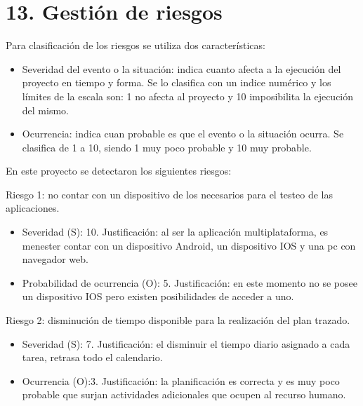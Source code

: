 \documentclass[
11pt, %
]{charter}
\begin{document}
\section{13. Gestión de riesgos}
\label{sec:riesgos}

Para clasificación de los riesgos se utiliza dos características: 
\begin{itemize}
\item Severidad del evento o la situación: indica cuanto afecta a la ejecución del proyecto en tiempo y forma. Se lo clasifica con un indice numérico y los límites de la escala son:  1 no afecta al proyecto y 10  imposibilita la ejecución del mismo.
\item Ocurrencia: indica cuan probable es que el evento o la situación ocurra. Se clasifica de 1 a 10, siendo 1 muy poco probable y 10 muy probable. 
\end{itemize}

En este proyecto se detectaron los siguientes riesgos:

 
Riesgo 1: no contar con un dispositivo de los necesarios para el testeo de las aplicaciones.
\begin{itemize}
	\item Severidad (S): 10.\newline 
	Justificación: al ser la aplicación multiplataforma, es menester contar con un dispositivo Android, un dispositivo IOS y una pc con navegador web.
	\item Probabilidad de ocurrencia (O): 5.\newline 
	Justificación: en este momento no se posee un dispositivo IOS pero existen posibilidades de acceder a uno.
\end{itemize}   

Riesgo 2: disminución de tiempo disponible para la realización del plan trazado.
\begin{itemize}
	\item Severidad (S): 7. \newline 
	Justificación: el disminuir el tiempo diario asignado a cada tarea, retrasa todo el calendario.
	\item Ocurrencia (O):3. \newline 
	Justificación: la planificación es correcta y es muy poco probable que surjan actividades adicionales que ocupen al recurso humano.
\end{itemize}
\end{document}
